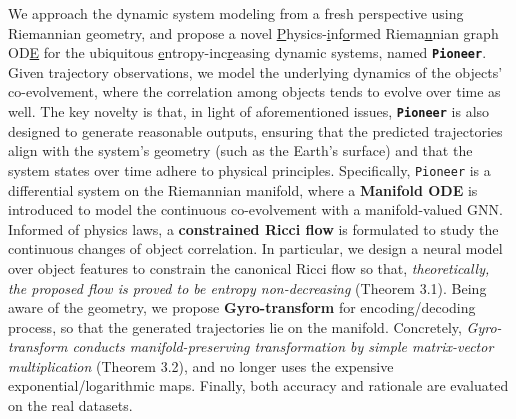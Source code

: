 We approach the dynamic system modeling from a fresh perspective using Riemannian geometry,
and propose a novel \underline{P}hysics-\underline{i}nf\underline{o}rmed Riema\underline{n}nian graph OD\underline{E} for the ubiquitous  \underline{e}ntropy-inc\underline{r}easing dynamic systems, named \textbf{\texttt{Pioneer}}.
Given trajectory observations,
we model the underlying dynamics of the objects' co-evolvement, 
where the correlation among objects tends to evolve over time as well.
The key novelty is that, 
in light of aforementioned issues, 
\textbf{\texttt{Pioneer}} is also designed to generate reasonable outputs, ensuring that the predicted trajectories align with the system's geometry (such as the Earth's surface) and that the system states over time adhere to physical principles.
Specifically, \texttt{Pioneer} is a differential system on the Riemannian manifold,
where  a \textbf{Manifold ODE} is introduced to model the continuous co-evolvement with a  manifold-valued GNN.
Informed of physics laws,
a \textbf{constrained Ricci flow} is formulated  to study the continuous changes of object correlation.
In particular, 
we design a neural model over object features to constrain the canonical Ricci flow so that, 
\emph{theoretically, the proposed flow is proved to be entropy non-decreasing} (Theorem 3.1).
Being aware of the geometry, 
we propose \textbf{Gyro-transform} for encoding/decoding process, 
so that the  generated trajectories lie on the manifold.
Concretely, \emph{Gyro-transform conducts manifold-preserving transformation by simple matrix-vector multiplication} (Theorem 3.2),
and no longer uses the expensive exponential/logarithmic maps.
Finally, both accuracy and rationale are evaluated on the real datasets.

